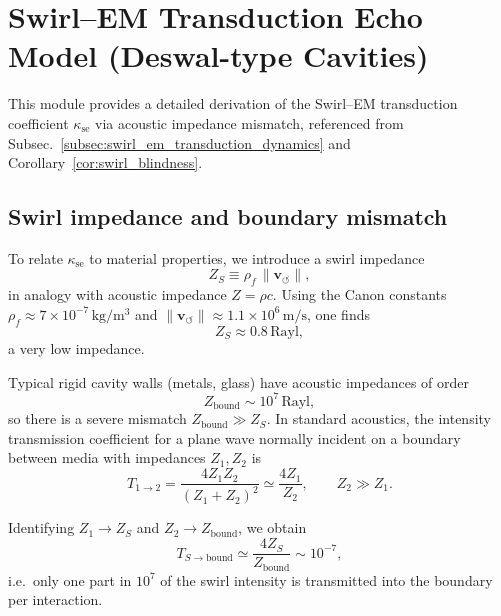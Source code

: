 \documentclass[10pt,reprint,aps,onecolumn,nofootinbib]{revtex4-2}
\newcommand{\vswirl}{\mathbf{v}_{\!\boldsymbol{\circlearrowleft}}}
\newcommand{\rhoF}{\rho_{\!f}}
\begin{document}
\section{Swirl--EM Transduction Echo Model (Deswal-type Cavities)}
\label{app:swirl_em_transduction_impedance}

This module provides a detailed derivation of the Swirl--EM transduction
coefficient $\kappa_{\text{se}}$ via acoustic impedance mismatch, referenced
from Subsec.~\ref{subsec:swirl_em_transduction_dynamics} and Corollary~\ref{cor:swirl_blindness}.

\subsection{Swirl impedance and boundary mismatch}

    To relate $\kappa_{\text{se}}$ to material properties, we introduce a swirl
    impedance
    \begin{equation}
        Z_S
        \equiv
        \rhoF \,\lVert\vswirl\rVert,
        \label{eq:swirl_impedance}
    \end{equation}
    in analogy with acoustic impedance $Z = \rho c$.\cite{KinslerAcoustics}
    Using the Canon constants $\rhoF \approx 7\times 10^{-7}\,\mathrm{kg/m^3}$
    and $\lVert\vswirl\rVert \approx 1.1\times 10^{6}\,\mathrm{m/s}$, one finds
    \begin{equation}
        Z_S \approx 0.8\,\mathrm{Rayl},
        \label{eq:Zs_numeric}
    \end{equation}
    a very low impedance.

    Typical rigid cavity walls (metals, glass) have acoustic impedances of order
    \begin{equation}
        Z_{\mathrm{bound}}
        \sim 10^{7}\,\mathrm{Rayl},
    \end{equation}
    so there is a severe mismatch $Z_{\mathrm{bound}} \gg Z_S$. In standard
    acoustics, the intensity transmission coefficient for a plane wave normally
    incident on a boundary between media with impedances $Z_1, Z_2$ is
    \begin{equation}
        T_{1\to 2}
        =
        \frac{4 Z_1 Z_2}{(Z_1 + Z_2)^2}
        \simeq
        \frac{4 Z_1}{Z_2},
        \qquad Z_2 \gg Z_1.
        \label{eq:acoustic_transmission}
    \end{equation}

    Identifying $Z_1 \to Z_S$ and $Z_2 \to Z_{\mathrm{bound}}$, we obtain
    \begin{equation}
        T_{S\to \mathrm{bound}}
        \simeq
        \frac{4 Z_S}{Z_{\mathrm{bound}}}
        \sim 10^{-7},
        \label{eq:swirl_transmission_numeric}
    \end{equation}
    i.e.\ only one part in $10^{7}$ of the swirl intensity is transmitted into
    the boundary per interaction.
\end{document}
